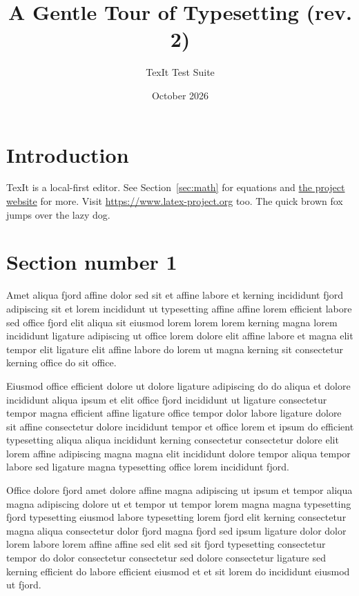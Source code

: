 \documentclass[11pt]{article}
\title{A Gentle Tour of Typesetting (rev. 2)}
\author{TexIt Test Suite}
\date{October 2026}
\begin{document}
\maketitle
\tableofcontents

\begin{center}\end{center}

\section{Introduction}\label{sec:intro}
TexIt is a local-first editor. See Section~\ref{sec:math} for equations and \href{https://example.com/texit}{the project website} for more.
Visit \url{https://www.latex-project.org} too. The quick brown fox jumps over the lazy dog.

\section{Section number 1}\label{sec:s1}
Amet aliqua fjord affine dolor sed sit et affine labore et kerning incididunt fjord adipiscing sit et lorem incididunt ut typesetting affine affine lorem efficient labore sed office fjord elit aliqua sit eiusmod lorem lorem lorem kerning magna lorem incididunt ligature adipiscing ut office lorem dolore elit affine labore et magna elit tempor elit ligature elit affine labore do lorem ut magna kerning sit consectetur kerning office do sit office.

Eiusmod office efficient dolore ut dolore ligature adipiscing do do aliqua et dolore incididunt aliqua ipsum et elit office fjord incididunt ut ligature consectetur tempor magna efficient affine ligature office tempor dolor labore ligature dolore sit affine consectetur dolore incididunt tempor et office lorem et ipsum do efficient typesetting aliqua aliqua incididunt kerning consectetur consectetur dolore elit lorem affine adipiscing magna magna elit incididunt dolore tempor aliqua tempor labore sed ligature magna typesetting office lorem incididunt fjord.

Office dolore fjord amet dolore affine magna adipiscing ut ipsum et tempor aliqua magna adipiscing dolore ut et tempor ut tempor lorem magna magna typesetting fjord typesetting eiusmod labore typesetting lorem fjord elit kerning consectetur magna aliqua consectetur dolor fjord magna fjord sed ipsum ligature dolor dolor lorem labore lorem affine affine sed elit sed sit fjord typesetting consectetur tempor do dolor consectetur consectetur sed dolore consectetur ligature sed kerning efficient do labore efficient eiusmod et et sit lorem do incididunt eiusmod ut fjord.
\end{document}
